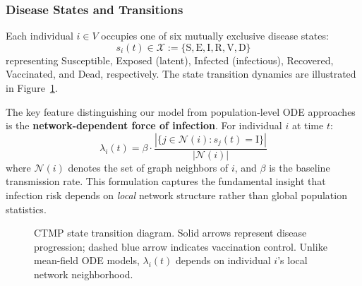 \subsubsection{Disease States and Transitions}

Each individual $i \in V$ occupies one of six mutually exclusive disease states:
\begin{equation}
s_i(t) \in \mathcal{X} := \{\text{S}, \text{E}, \text{I}, \text{R}, \text{V}, \text{D}\}
\end{equation}
representing Susceptible, Exposed (latent), Infected (infectious), Recovered,
Vaccinated, and Dead, respectively. The state transition dynamics are illustrated
in Figure~\ref{fig:state_diagram}.

The key feature distinguishing our model from population-level ODE approaches is the
\textbf{network-dependent force of infection}. For individual $i$ at time $t$:
\begin{equation}
\lambda_i(t) = \beta \cdot \frac{|\{j \in \mathcal{N}(i) : s_j(t) = \text{I}\}|}{|\mathcal{N}(i)|}
\label{eq:foi}
\end{equation}
where $\mathcal{N}(i)$ denotes the set of graph neighbors of $i$, and $\beta$ is the
baseline transmission rate. This formulation captures the fundamental insight that
infection risk depends on \emph{local} network structure rather than global population statistics.

\begin{figure}[t]
\centering
{}
\caption{CTMP state transition diagram. Solid arrows represent disease progression;
dashed blue arrow indicates vaccination control. Unlike mean-field ODE models,
$\lambda_i(t)$ depends on individual $i$'s local network neighborhood.}
\label{fig:state_diagram}
\end{figure}

